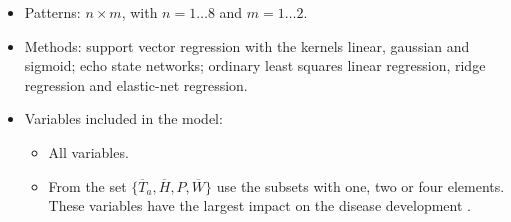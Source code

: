 \begin{itemize}
\item Patterns: $n\times{}m$, with $n=1\ldots{}8$ and $m=1\ldots{}2$.
\item Methods: support vector regression with the kernels linear,
  gaussian and sigmoid; echo state networks; ordinary least squares
  linear regression, ridge regression and elastic-net regression.
\item Variables included in the model:
\begin{itemize}
\item All variables.
\item From the set $\{ \overline{T}_{a} , \overline{H}, P ,
  \overline{W} \}$ use the subsets with one, two or four
  elements. These variables have the largest impact on the disease
  development \citep{MarinVargas1995}.
\end{itemize}

\end{itemize}
